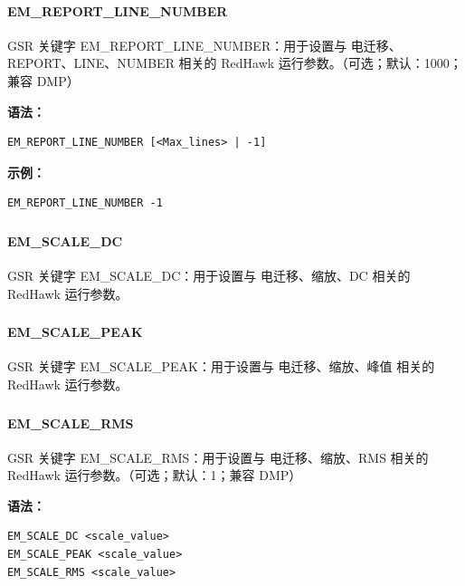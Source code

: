 \paragraph*{EM_REPORT_LINE_NUMBER}

GSR 关键字 EM_REPORT_LINE_NUMBER：用于设置与 电迁移、REPORT、LINE、NUMBER 相关的 RedHawk 运行参数。（可选；默认：1000；兼容 DMP）

\textbf{语法：}
\begin{lstlisting}
EM_REPORT_LINE_NUMBER [<Max_lines> | -1]
\end{lstlisting}

\textbf{示例：}
\begin{lstlisting}
EM_REPORT_LINE_NUMBER -1
\end{lstlisting}

\subsubsection{}
\paragraph*{EM_SCALE_DC}

GSR 关键字 EM_SCALE_DC：用于设置与 电迁移、缩放、DC 相关的 RedHawk 运行参数。

\subsubsection{}
\paragraph*{EM_SCALE_PEAK}

GSR 关键字 EM_SCALE_PEAK：用于设置与 电迁移、缩放、峰值 相关的 RedHawk 运行参数。

\subsubsection{}
\paragraph*{EM_SCALE_RMS}

GSR 关键字 EM_SCALE_RMS：用于设置与 电迁移、缩放、RMS 相关的 RedHawk 运行参数。（可选；默认：1；兼容 DMP）

\textbf{语法：}
\begin{lstlisting}
EM_SCALE_DC <scale_value>
EM_SCALE_PEAK <scale_value>
EM_SCALE_RMS <scale_value>
\end{lstlisting}

